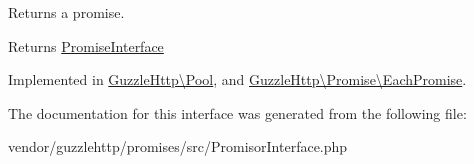 Returns a promise.

\begin{DoxyReturn}{Returns}
\hyperlink{interfaceGuzzleHttp_1_1Promise_1_1PromiseInterface}{Promise\+Interface} 
\end{DoxyReturn}


Implemented in \hyperlink{classGuzzleHttp_1_1Pool_a560fb5c3929b5d33fa6cc830c1dc1382}{Guzzle\+Http\textbackslash{}\+Pool}, and \hyperlink{classGuzzleHttp_1_1Promise_1_1EachPromise_ad1e93c51efc4d3159416f1b4ba47afbe}{Guzzle\+Http\textbackslash{}\+Promise\textbackslash{}\+Each\+Promise}.



The documentation for this interface was generated from the following file\+:\begin{DoxyCompactItemize}
\item 
vendor/guzzlehttp/promises/src/Promisor\+Interface.\+php\end{DoxyCompactItemize}
